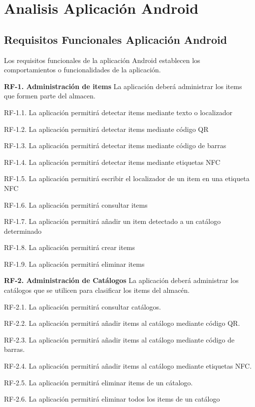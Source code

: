 \documentclass[a4paper,11pt]{book}
\begin{document}
\section{Analisis Aplicación Android}

\subsection{Requisitos Funcionales Aplicación Android}
Los requisitos funcionales de la aplicación Android establecen los comportamientos o funcionalidades de la aplicación.

\textbf{RF-1. Administración de items} La aplicación deberá administrar los items que formen parte del almacen.   

RF-1.1. La aplicación permitirá detectar items mediante texto o localizador
	
RF-1.2. La aplicación permitirá detectar items mediante código QR
	
RF-1.3. La aplicación permitirá detectar items mediante código de barras
	
RF-1.4. La aplicación permitirá detectar items mediante etiquetas NFC
	
RF-1.5. La aplicación permitirá escribir el localizador de un item en una etiqueta NFC
	
RF-1.6. La aplicación permitirá consultar items
	
RF-1.7. La aplicación permitirá añadir un item detectado a un catálogo determinado
	
RF-1.8. La aplicación permitirá crear items

RF-1.9. La aplicación permitirá eliminar items


\textbf{RF-2. Administración de Catálogos} La aplicación deberá administrar los catálogos que se utilicen para clasificar los items del almacén.   


	RF-2.1. La aplicación permitirá consultar catálogos.
	
	RF-2.2. La aplicación permitirá añadir items  al catálogo mediante código QR.
	
	RF-2.3. La aplicación permitirá añadir items al catálogo mediante código de barras.

	RF-2.4. La aplicación permitirá añadir items al catálogo mediante etiquetas NFC.
	
	RF-2.5. La aplicación permitirá eliminar items de un cátalogo.
	
	RF-2.6. La aplicación permitirá eliminar todos los items de un catálogo
	
\end{document}

